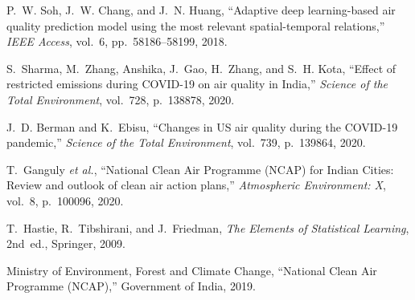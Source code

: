 \documentclass[12pt,a4paper]{report}
\begin{document}
\begin{enumerate}[leftmargin=1.5cm, label={[\arabic*]}]
\item P.~W. Soh, J.~W. Chang, and J.~N. Huang, ``Adaptive deep learning-based air quality prediction model using the most relevant spatial-temporal relations,'' \textit{IEEE Access}, vol.~6, pp.~58186--58199, 2018.

\item S.~Sharma, M.~Zhang, Anshika, J.~Gao, H.~Zhang, and S.~H. Kota, ``Effect of restricted emissions during COVID-19 on air quality in India,'' \textit{Science of the Total Environment}, vol.~728, p.~138878, 2020.

\item J.~D. Berman and K.~Ebisu, ``Changes in US air quality during the COVID-19 pandemic,'' \textit{Science of the Total Environment}, vol.~739, p.~139864, 2020.

\item T.~Ganguly \textit{et al.}, ``National Clean Air Programme (NCAP) for Indian Cities: Review and outlook of clean air action plans,'' \textit{Atmospheric Environment: X}, vol.~8, p.~100096, 2020.

\item T.~Hastie, R.~Tibshirani, and J.~Friedman, \textit{The Elements of Statistical Learning}, 2nd~ed., Springer, 2009.

\item Ministry of Environment, Forest and Climate Change, ``National Clean Air Programme (NCAP),'' Government of India, 2019.

\end{enumerate}

\end{document}
